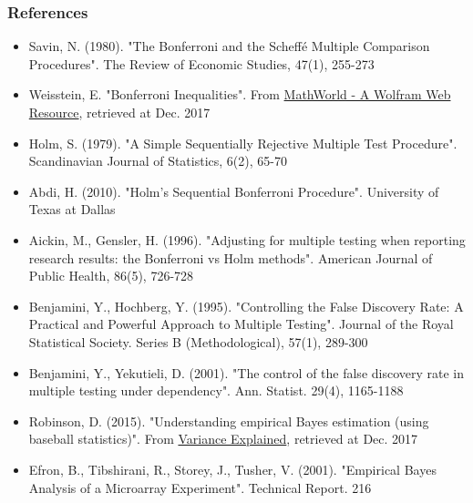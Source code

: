 \documentclass{beamer}
\begin{document}
\frame
{
    \frametitle{\LARGE References}
    \scriptsize
    \begin{itemize}
    \item Savin, N. (1980). "The Bonferroni and the Scheff\'e Multiple Comparison Procedures". The Review of Economic Studies, 47(1), 255-273\\
\item Weisstein, E. "Bonferroni Inequalities". From \href{http://mathworld.wolfram.com/BonferroniInequalities.html}{MathWorld - A Wolfram Web Resource}, retrieved at Dec. 2017
\item Holm, S. (1979). "A Simple Sequentially Rejective Multiple Test Procedure". Scandinavian Journal of Statistics, 6(2), 65-70\\
\item Abdi, H. (2010). "Holm's Sequential Bonferroni Procedure". University of Texas at Dallas\\
\item Aickin, M., Gensler, H. (1996). "Adjusting for multiple testing when reporting research results: the Bonferroni vs Holm methods". American Journal of Public Health, 86(5), 726-728\\
\item Benjamini, Y., Hochberg, Y. (1995). "Controlling the False Discovery Rate: A Practical and Powerful Approach to Multiple Testing". Journal of the Royal Statistical Society. Series B (Methodological), 57(1), 289-300\\
\item Benjamini, Y., Yekutieli, D. (2001). "The control of the false discovery rate in multiple testing under dependency". Ann. Statist. 29(4), 1165-1188\\
\item Robinson, D. (2015). "Understanding empirical Bayes estimation (using baseball statistics)". From \href{http://varianceexplained.org/r/empirical\_bayes\_baseball/}{Variance Explained}, retrieved at Dec. 2017 \\
\item Efron, B., Tibshirani, R., Storey, J., Tusher, V. (2001). "Empirical Bayes Analysis of a Microarray Experiment". Technical Report. 216\\
    \end{itemize}
}
\end{document}
